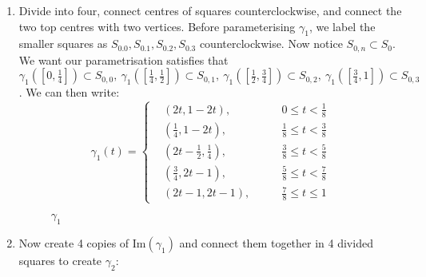 \documentclass[a4paper]{article}
\theoremstyle{definition}
\begin{document}
\begin{enumerate}
    \item Divide into four, connect centres of squares counterclockwise, and connect the two top centres with two vertices. Before parameterising $\gamma_1$, we label the smaller squares as $S_{0.0},S_{0.1},S_{0.2},S_{0.3}$ counterclockwise. Now notice $S_{0,n} \subset S_0$. We want our parametrisation satisfies that $\gamma_1 \left( \left[0,\frac14 \right]\right) \subset S_{0,0},\ \gamma_1 \left( \left[\frac14,\frac12 \right]\right) \subset S_{0,1},\ \gamma_1 \left( \left[\frac12,\frac34 \right]\right) \subset S_{0,2},\ \gamma_1 \left( \left[\frac34,1 \right]\right) \subset S_{0,3}$. We can then write:
    \[
    \gamma_1(t) = \left\{\begin{aligned}
        &\left(2t,1-2t\right),\qquad & 0\leq t < \frac18 \\
        &\left(\frac14,1-2t\right),\qquad & \frac18 \leq t < \frac38 \\
        &\left(2t-\frac12,\frac14\right),\qquad & \frac38 \leq t < \frac58 \\
        &\left(\frac34, 2t-1\right),\qquad & \frac58 \leq t <\frac78 \\
        &\left(2t-1, 2t-1\right),\qquad & \frac78 \leq t \leq 1
    \end{aligned} \right .
    \]
    \begin{figure}[h]
    \centering
    \caption*{$\gamma_1$}
    \label{fig:gamma1}
\end{figure}
\item Now create 4 copies of $\text{Im}(\gamma_1)$ and connect them together in 4 divided squares to create $\gamma_2$:


\end{enumerate}
\end{document}
